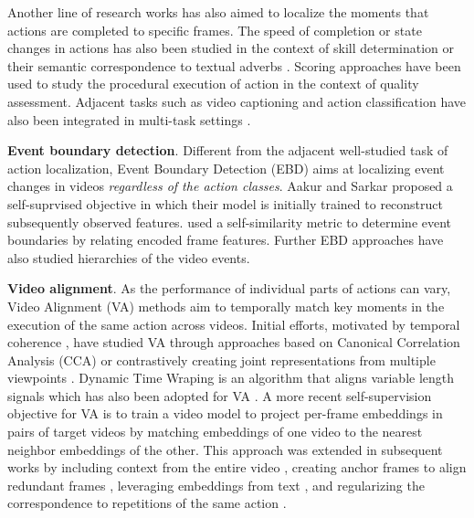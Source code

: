 \documentclass[smallextended,twocolumn,natbib]{svjour3}
\begin{document}
Another line of research works \citep{heidarivincheh2018action,heidarivincheh2016beyond} has also aimed to localize the moments that actions are completed to specific frames. The speed of completion or state changes in actions has also been studied in the context of skill determination \citep{doughty2018s} or their semantic correspondence to textual adverbs \citep{doughty2020action,doughty2022you,moltisanti2023learning}. Scoring approaches \citep{tang2020uncertainty} have been used to study the procedural execution of action in the context of quality assessment. Adjacent tasks such as video captioning and action classification have also been integrated in multi-task settings \citep{parmar2019and}.


\noindent
\textbf{Event boundary detection}. Different from the adjacent well-studied task of action localization, Event Boundary Detection (EBD) \citep{shou2021generic} aims at localizing event changes in videos \emph{regardless of the action classes}.
Aakur and Sarkar \citep{aakur2019perceptual} proposed a self-suprvised objective
in which their model is initially trained to reconstruct subsequently observed features. \citep{shou2021generic} used a self-similarity metric to determine event boundaries by relating encoded frame features. Further EBD approaches \citep{mounir2024streamer} have also studied hierarchies of the video events. 


\noindent
\textbf{Video alignment}. As the performance of individual parts of actions can vary, Video Alignment (VA) methods aim to temporally match key moments in the execution of the same action across videos. Initial efforts, motivated by temporal coherence \citep{goroshin2015unsupervised,fernando2017self,zhang2023modeling}, have studied VA through approaches based on Canonical Correlation Analysis (CCA) \citep{andrew2013deep} or contrastively creating joint representations from multiple viewpoints \citep{sermanet2018time}. Dynamic Time Wraping \citep{sakoe1978dynamic} is an algorithm that aligns variable length signals which has also been adopted for VA \citep{chang2019d3tw,hadji2021representation,dvornik2021drop}. A more recent self-supervision objective \citep{dwibedi2018temporal} for VA is to train a video model to project per-frame embeddings in pairs of target videos by matching embeddings of one video to the nearest neighbor embeddings of the other. This approach was extended in subsequent works by including context from the entire video \citep{haresh2021learning}, creating anchor frames to align redundant frames \citep{liu2022learning}, leveraging embeddings from text \citep{epstein2021learning}, and regularizing the correspondence to repetitions of the same action \citep{donahue2024learning}.
 
\end{document}
